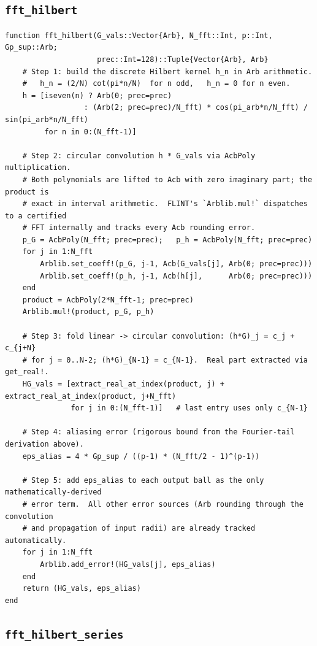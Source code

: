 \documentclass[11pt]{article}
\theoremstyle{definition}
\begin{document}
\subsection{\texttt{fft\_hilbert}}

\begin{lstlisting}
function fft_hilbert(G_vals::Vector{Arb}, N_fft::Int, p::Int, Gp_sup::Arb;
                     prec::Int=128)::Tuple{Vector{Arb}, Arb}
    # Step 1: build the discrete Hilbert kernel h_n in Arb arithmetic.
    #   h_n = (2/N) cot(pi*n/N)  for n odd,   h_n = 0 for n even.
    h = [iseven(n) ? Arb(0; prec=prec)
                  : (Arb(2; prec=prec)/N_fft) * cos(pi_arb*n/N_fft) / sin(pi_arb*n/N_fft)
         for n in 0:(N_fft-1)]

    # Step 2: circular convolution h * G_vals via AcbPoly multiplication.
    # Both polynomials are lifted to Acb with zero imaginary part; the product is
    # exact in interval arithmetic.  FLINT's `Arblib.mul!` dispatches to a certified
    # FFT internally and tracks every Acb rounding error.
    p_G = AcbPoly(N_fft; prec=prec);   p_h = AcbPoly(N_fft; prec=prec)
    for j in 1:N_fft
        Arblib.set_coeff!(p_G, j-1, Acb(G_vals[j], Arb(0; prec=prec)))
        Arblib.set_coeff!(p_h, j-1, Acb(h[j],      Arb(0; prec=prec)))
    end
    product = AcbPoly(2*N_fft-1; prec=prec)
    Arblib.mul!(product, p_G, p_h)

    # Step 3: fold linear -> circular convolution: (h*G)_j = c_j + c_{j+N}
    # for j = 0..N-2; (h*G)_{N-1} = c_{N-1}.  Real part extracted via get_real!.
    HG_vals = [extract_real_at_index(product, j) + extract_real_at_index(product, j+N_fft)
               for j in 0:(N_fft-1)]   # last entry uses only c_{N-1}

    # Step 4: aliasing error (rigorous bound from the Fourier-tail derivation above).
    eps_alias = 4 * Gp_sup / ((p-1) * (N_fft/2 - 1)^(p-1))

    # Step 5: add eps_alias to each output ball as the only mathematically-derived
    # error term.  All other error sources (Arb rounding through the convolution
    # and propagation of input radii) are already tracked automatically.
    for j in 1:N_fft
        Arblib.add_error!(HG_vals[j], eps_alias)
    end
    return (HG_vals, eps_alias)
end
\end{lstlisting}

\subsection{\texttt{fft\_hilbert\_series}}
\end{document}
